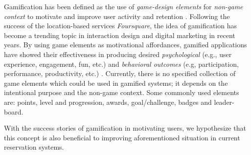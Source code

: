 Gamification has been defined as the use of \emph{game-design elements} for \emph{non-game context} to motivate and improve user activity and retention \cite{deterding2011game, hamari2014does}. Following the success of the location-based services \emph{Foursquare}, the idea of gamification has become a trending topic in interaction design and digital marketing \cite{deterding2011game} in recent years. By using game elements as motivational affordances, gamified applications have showed their effectiveness in producing desired \emph{psychological} (e.g., user experience, engagement, fun, etc.) and \emph{behavioral outcomes} (e.g, participation, performance, productivity, etc.) \cite{deterding2011game}. Currently, there is no specified collection of game elements which could be used in gamified systems; it depends on the intentional purpose and the non-game context. Some commonly used elements are: points, level and progression, awards, goal/challenge, badges and leader-board.

With the success stories of gamification in motivating users, we hypothesize that this concept is also beneficial to improving aforementioned situation in current reservation systems.